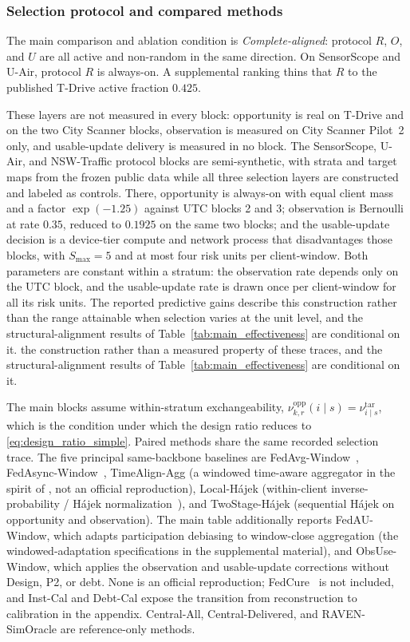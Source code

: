 \documentclass[letterpaper,journal]{IEEEtran}
\begin{document}
\subsubsection{Selection protocol and compared methods}

The main comparison and ablation condition is \emph{Complete-aligned}: protocol $R$, $O$,
and $U$ are all active and non-random in the same direction.  On
SensorScope and U-Air, protocol $R$ is always-on.  A supplemental ranking
thins that $R$ to the published T-Drive active fraction $0.425$.

These layers are not measured in every block: opportunity is real on T-Drive and
on the two City Scanner blocks, observation is measured on City Scanner Pilot~2
only, and usable-update delivery is measured in no block.  The SensorScope,
U-Air, and NSW-Traffic protocol blocks are semi-synthetic, with strata and target
maps from the frozen public data while all three selection layers are constructed
and labeled as controls.  There, opportunity is always-on with equal client mass
and a factor $\exp(-1.25)$ against UTC blocks 2 and 3; observation is Bernoulli at
rate $0.35$, reduced to $0.1925$ on the same two blocks; and the usable-update
decision is a device-tier compute and network process that disadvantages those
blocks, with $S_{\max}=5$ and at most four risk units per client-window.  Both
parameters are constant within a stratum: the observation rate depends only on
the UTC block, and the usable-update rate is drawn once per client-window for all
its risk units.  The reported predictive gains describe this construction rather
than the range attainable when selection varies at the unit level, and the
structural-alignment results of Table~\ref{tab:main_effectiveness} are
conditional on it.
the construction rather than a measured property of these traces, and the
structural-alignment results of Table~\ref{tab:main_effectiveness} are
conditional on it.

The main blocks assume within-stratum exchangeability,
$\nu^{\mathrm{opp}}_{k,r}(i\mid s)=\nu^{\mathrm{tar}}_{i\mid s}$, which is the
condition under which the design ratio reduces to
\eqref{eq:design_ratio_simple}.  Paired methods share the same recorded selection trace.
The five principal same-backbone baselines are
FedAvg-Window~\cite{mcmahan2017communication},
FedAsync-Window~\cite{xie2019asynchronous},
TimeAlign-Agg (a windowed time-aware aggregator in the spirit of
\cite{wang2026federated}, not an official reproduction),
Local-H\'ajek (within-client inverse-probability / H\'ajek
normalization~\cite{horvitz1952generalization,hajek1971comment}), and
TwoStage-H\'ajek (sequential H\'ajek on opportunity and observation).  The main
table additionally reports FedAU-Window, which adapts participation debiasing
\cite{wang2024lightweight} to window-close aggregation (the
windowed-adaptation specifications in the supplemental material), and
ObsUse-Window, which applies the observation and usable-update corrections
without Design, P2, or debt.  None is an official reproduction;
FedCure~\cite{chen2026fedcure} is not included, and Inst-Cal and Debt-Cal expose
the transition from reconstruction to calibration in the appendix.
Central-All, Central-Delivered, and RAVEN-SimOracle are reference-only methods.
\end{document}
